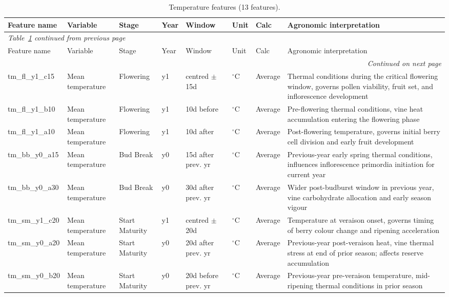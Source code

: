 {\footnotesize
\setlength{\tabcolsep}{3pt}
\begin{longtable}{p{2.2cm}|p{1.5cm}|p{1.2cm}|p{0.4cm}|p{1.4cm}|p{0.7cm}|p{0.9cm}|p{4.8cm}}
\caption{Temperature features (13 features).}\label{tab:appc_1}\\
\toprule
Feature name & Variable & Stage & Year & Window & Unit & Calc & Agronomic interpretation \\
\midrule
\endfirsthead
\multicolumn{8}{l}{\textit{Table~\ref{tab:appc_1} continued from previous page}}\\
\toprule
Feature name & Variable & Stage & Year & Window & Unit & Calc & Agronomic interpretation \\
\midrule
\endhead
\midrule
\multicolumn{8}{r}{\textit{Continued on next page}}\\
\endfoot
\bottomrule
\endlastfoot
tm\_fl\_y1\_c15 & Mean temperature & Flowering & y1 & centred $\pm$15d & $^\circ$C & Average & Thermal conditions during the critical flowering window, governs pollen viability, fruit set, and inflorescence development \\
tm\_fl\_y1\_b10 & Mean temperature & Flowering & y1 & 10d before & $^\circ$C & Average & Pre-flowering thermal conditions, vine heat accumulation entering the flowering phase \\
tm\_fl\_y1\_a10 & Mean temperature & Flowering & y1 & 10d after & $^\circ$C & Average & Post-flowering temperature, governs initial berry cell division and early fruit development \\
tm\_bb\_y0\_a15 & Mean temperature & Bud Break & y0 & 15d after prev. yr & $^\circ$C & Average & Previous-year early spring thermal conditions, influences inflorescence primordia initiation for current year \\
tm\_bb\_y0\_a30 & Mean temperature & Bud Break & y0 & 30d after prev. yr & $^\circ$C & Average & Wider post-budburst window in previous year, vine carbohydrate allocation and early season vigour \\
tm\_sm\_y1\_c20 & Mean temperature & Start Maturity & y1 & centred $\pm$20d & $^\circ$C & Average & Temperature at veraison onset, governs timing of berry colour change and ripening acceleration \\
tm\_sm\_y0\_a20 & Mean temperature & Start Maturity & y0 & 20d after prev. yr & $^\circ$C & Average & Previous-year post-veraison heat, vine thermal stress at end of prior season; affects reserve accumulation \\
tm\_sm\_y0\_b20 & Mean temperature & Start Maturity & y0 & 20d before prev. yr & $^\circ$C & Average & Previous-year pre-veraison temperature, mid-ripening thermal conditions in prior season \\

\end{longtable}}
